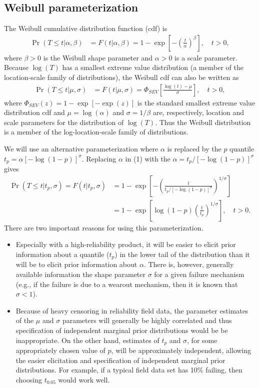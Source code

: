 \documentclass[aoas]{imsart}
\begin{document}
\subsection{Weibull parameterization}
\label{sec:Weibull parameterization}
The Weibull cumulative
 distribution function (cdf) is
\begin{align}
\label{equation:weibull.cdf}
\Pr(T \leq t|\alpha,\beta ) &= F(t|\alpha,\beta)=1-
\exp \left [-\left (\frac{t}{\alpha} \right )^{\beta}
\right ], \quad t > 0,
\end{align}
where $\beta>0$ is the Weibull shape parameter and $\alpha>0$ is a
scale parameter. Because $\log(T)$ has a smallest extreme value
distribution (a member of the location-scale family of
distributions), the Weibull cdf can also be written as
\begin{align*}
\Pr(T \leq t| \mu,\sigma ) &= F(t| \mu,\sigma)= \Phi_{SEV}\left[\frac{\log(t)-\mu}{\sigma}\right], \quad t > 0,
\end{align*}
where $\Phi_{SEV}(z)=1-\exp[-\exp(z)]$ is the standard smallest extreme value
distribution cdf and
$\mu=\log(\alpha)$ and $\sigma=1/\beta$ are, respectively, location
and scale parameters for the distribution of $\log(T)$. Thus the Weibull
distribution is a member of the log-location-scale family of
distributions.

We will use an alternative parameterization
where $\alpha$ is replaced by the $p$ quantile $t_{p}=\alpha \left
[-\log(1-p)\right ]^{\sigma}$. Replacing $\alpha$ in (1) with the
$\alpha=t_{p}/[-\log(1-p)]^{\sigma}$ gives
\begin{align*}
\nonumber
\Pr(T \leq t|t_{p},\sigma ) = F(t|t_{p},\sigma)&=1-
\exp \left [-\left (\frac{t}{t_{p}/[-\log(1-p)]^{\sigma}} \right )^{1/ \sigma}
\right ]\\
\label{equation:reparameterized.weibull.cdf}
&=1 - \exp\left[\log(1-p)\left(\frac{t}{t_{p}}\right)^{1/\sigma}\right], \quad t > 0.
\end{align*}
There are two important reasons for using this parameterization.
\begin{itemize}
\item
Especially with a high-reliability product, it will be easier to
elicit prior information about a quantile  ($t_p$) in the lower tail of the
distribution than it will be to elicit prior information about
$\alpha$. There is, however, generally available
information the shape parameter $\sigma$ for a given failure
mechanism (e.g., if the failure is due to a wearout mechanism, then
it is known that $\sigma<1$). 
\item
Because of heavy censoring in reliability field data, the parameter
estimates of the $\mu$ and $\sigma$ parameters will generally be
highly correlated and thus specification of independent marginal
prior distributions would be be inappropriate. On the other hand,
estimates of $t_{p}$ and $\sigma$, for some appropriately chosen
value of $p$, will be approximately independent, allowing the easier
elicitation and specification of independent marginal prior
distributions. For example, if a typical field data set has 10\%
failing, then choosing $t_{0.05}$ would 
work well.
\end{itemize}
\end{document}
